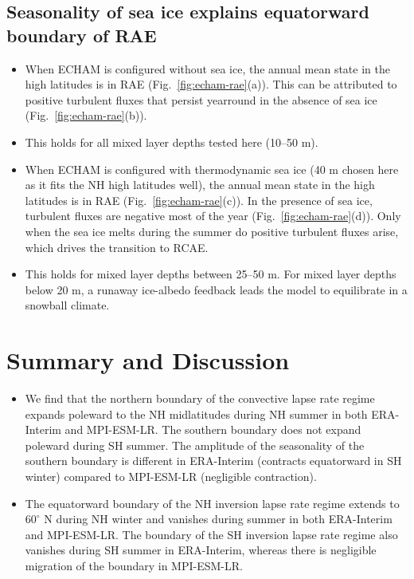 \documentclass{ametsocV5}
\begin{document}
\subsection{Seasonality of sea ice explains equatorward boundary of RAE}
\begin{itemize}
  \item When ECHAM is configured without sea ice, the annual mean state in the high latitudes is in RAE (Fig.~\ref{fig:echam-rae}(a)). This can be attributed to positive turbulent fluxes that persist yearround in the absence of sea ice (Fig.~\ref{fig:echam-rae}(b)).
  \item This holds for all mixed layer depths tested here (10--50 m).
  \item When ECHAM is configured with thermodynamic sea ice (40 m chosen here as it fits the NH high latitudes well), the annual mean state in the high latitudes is in RAE (Fig.~\ref{fig:echam-rae}(c)). In the presence of sea ice, turbulent fluxes are negative most of the year (Fig.~\ref{fig:echam-rae}(d)). Only when the sea ice melts during the summer do positive turbulent fluxes arise, which drives the transition to RCAE.
  \item This holds for mixed layer depths between 25--50 m. For mixed layer depths below 20 m, a runaway ice-albedo feedback leads the model to equilibrate in a snowball climate.
\end{itemize}

\section{Summary and Discussion}
\begin{itemize}
  \item We find that the northern boundary of the convective lapse rate regime expands poleward to the NH midlatitudes during NH summer in both ERA-Interim and MPI-ESM-LR. The southern boundary does not expand poleward during SH summer. The amplitude of the seasonality of the southern boundary is different in ERA-Interim (contracts equatorward in SH winter) compared to MPI-ESM-LR (negligible contraction).
  \item The equatorward boundary of the NH inversion lapse rate regime extends to \(60^{\circ}\) N during NH winter and vanishes during summer in both ERA-Interim and MPI-ESM-LR. The boundary of the SH inversion lapse rate regime also vanishes during SH summer in ERA-Interim, whereas there is negligible migration of the boundary in MPI-ESM-LR.

\end{itemize}
\end{document}
